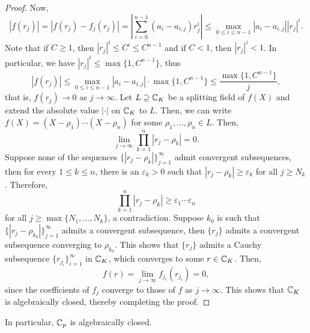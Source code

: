 \begin{proof}
    Now, 
    \begin{equation*}
        |f(r_j)| = |f(r_j) - f_j(r_j)| = \left|\sum_{i = 0}^{n - 1} (a_i - a_{i, j})r_j^i\right|\le\max_{0\le i\le n - 1} |a_i - a_{i, j}| |r_j|^i.
    \end{equation*}
    Note that if $C\ge 1$, then $|r_j|^i\le C^i\le C^{n - 1}$ and if $C < 1$, then $|r_j|^i < 1$. In particular, we have $|r_j|^i\le\max\{1, C^{n - 1}\}$, thus 
    \begin{equation*}
        |f(r_j)|\le \max_{0\le i\le n - 1} |a_i - a_{i, j}|\cdot\max\{1, C^{n - 1}\}\le\frac{\max\{1, C^{n - 1}\}}{j},
    \end{equation*}
    that is, $f(r_j)\to 0$ as $j\to\infty$. Let $L\supseteq\mathbb{C}_K$ be a splitting field of $f(X)$ and extend the absolute value $|\cdot|$ on $\mathbb{C}_K$ to $L$. Then, we can write $f(X) = (X - \rho_1)\cdots(X - \rho_n)$ for some $\rho_1,\dots,\rho_n\in L$. Then, 
    \begin{equation*}
        \lim_{j\to\infty}\prod_{k = 1}^n |r_j - \rho_k| = 0.
    \end{equation*}
    Suppose none of the sequences $\{|r_j - \rho_k|\}_{j = 1}^\infty$ admit convergent subsequences, then for every $1\le k\le n$, there is an $\varepsilon_k > 0$ such that $|r_j - \rho_k|\ge\varepsilon_k$ for all $j\ge N_k$. Therefore, 
    \begin{equation*}
        \prod_{k = 1}^n |r_j - \rho_k|\ge\varepsilon_1\cdots\varepsilon_n
    \end{equation*}
    for all $j\ge\max\{N_1,\dots, N_k\}$, a contradiction. Suppose $k_0$ is such that $\{|r_j - \rho_{k_0}|\}_{j = 1}^\infty$ admits a convergent subsequence, then $\{r_j\}$ admits a convergent subsequence converging to $\rho_{k_0}$. This shows that $\{r_j\}$ admits a Cauchy subsequence $\{r_{j_i}\}_{i = 1}^\infty$ in $\mathbb{C}_K$, which converges to some $r\in\mathbb{C}_K$. Then, 
    \begin{equation*}
        f(r) = \lim_{j\to\infty} f_{j_i}(r_{j_i}) = 0,
    \end{equation*}
    since the coefficients of $f_j$ converge to those of $f$ as $j\to\infty$. This shows that $\mathbb{C}_K$ is algebraically closed, thereby completing the proof.
\end{proof}

\begin{remark}
    In particular, $\mathbb{C}_p$ is algebraically closed.
\end{remark}

